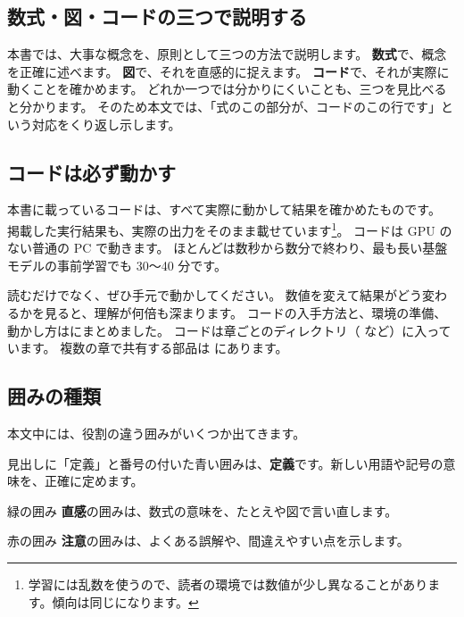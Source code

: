 \subsection*{数式・図・コードの三つで説明する}

本書では、大事な概念を、原則として三つの方法で説明します。
\textbf{数式}で、概念を正確に述べます。
\textbf{図}で、それを直感的に捉えます。
\textbf{コード}で、それが実際に動くことを確かめます。
どれか一つでは分かりにくいことも、三つを見比べると分かります。
そのため本文では、「式のこの部分が、コードのこの行です」という対応をくり返し示します。

\subsection*{コードは必ず動かす}

本書に載っているコードは、すべて実際に動かして結果を確かめたものです。
掲載した実行結果も、実際の出力をそのまま載せています\footnote{学習には乱数を使うので、読者の環境では数値が少し異なることがあります。傾向は同じになります。}。
コードは GPU のない普通の PC で動きます。
ほとんどは数秒から数分で終わり、最も長い基盤モデルの事前学習でも 30〜40 分です。

読むだけでなく、ぜひ手元で動かしてください。
数値を変えて結果がどう変わるかを見ると、理解が何倍も深まります。
コードの入手方法と、環境の準備、動かし方はにまとめました。
コードは章ごとのディレクトリ（ など）に入っています。
複数の章で共有する部品は  にあります。

\subsection*{囲みの種類}

本文中には、役割の違う囲みがいくつか出てきます。

\begin{definition}[囲みの例]
見出しに「定義」と番号の付いた青い囲みは、\textbf{定義}です。新しい用語や記号の意味を、正確に定めます。
\end{definition}
\vspace{-2mm}
\begin{intuition}{緑の囲み}
\textbf{直感}の囲みは、数式の意味を、たとえや図で言い直します。
\end{intuition}
\vspace{-2mm}
\begin{caution}{赤の囲み}
\textbf{注意}の囲みは、よくある誤解や、間違えやすい点を示します。
\end{caution}

